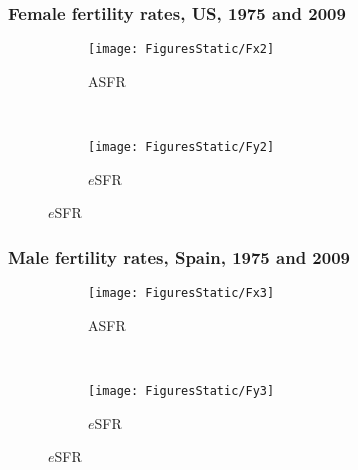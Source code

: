\documentclass{beamer}
\begin{document}

\begin{frame}
\frametitle{Female fertility rates, US, 1975 and 2009}
\vspace{-5em}
\begin{figure}
        \centering
        \begin{subfigure}[b]{0.5\textwidth}
                \centering
                \caption*{ASFR}
                \texttt{[image: FiguresStatic/Fx2]}
        \end{subfigure}%
        ~ %
        \begin{subfigure}[b]{0.5\textwidth}
                \centering
                \caption*{$e$SFR}
                \texttt{[image: FiguresStatic/Fy2]}
        \end{subfigure}
\end{figure}
\end{frame}


\begin{frame}
\frametitle{Male fertility rates, Spain, 1975 and 2009}
\vspace{-5em}
\begin{figure}
        \centering
        \begin{subfigure}[b]{0.5\textwidth}
                \centering
                \caption*{ASFR}
                \texttt{[image: FiguresStatic/Fx3]}
        \end{subfigure}%
        ~ %
        \begin{subfigure}[b]{0.5\textwidth}
                \centering
                \caption*{$e$SFR}
                \texttt{[image: FiguresStatic/Fy3]}
        \end{subfigure}
\end{figure}
\end{frame}

\end{document}
